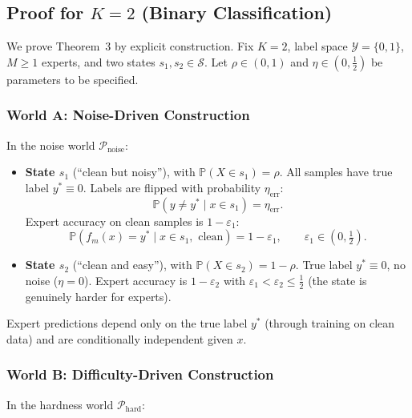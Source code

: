 \subsection{Proof for $K=2$ (Binary Classification)}
\label{sec:thm3_proof_K2}

We prove Theorem~3 by explicit construction.  Fix $K=2$, label space
$\mathcal{Y}=\{0,1\}$, $M\ge 1$ experts, and two states $s_1,s_2\in\mathcal{S}$.
Let $\rho\in(0,1)$ and $\eta\in(0,\tfrac12)$ be parameters to be specified.

\subsubsection{World A: Noise-Driven Construction}
\label{sec:thm3_worldA}

In the noise world $\mathcal{P}_{\text{noise}}$:

\begin{itemize}
  \item \textbf{State $s_1$} (``clean but noisy''), with
    $\mathbb{P}(X\in s_1)=\rho$.  All samples have true label $y^*\equiv0$.
    Labels are flipped with probability $\eta_{\text{err}}$:
    \[
    \mathbb{P}(y\neq y^* \mid x\in s_1)=\eta_{\text{err}}.
    \]
    Expert accuracy on clean samples is $1-\varepsilon_1$:
    \[
    \mathbb{P}(f_m(x)=y^* \mid x\in s_1,\text{ clean})=1-\varepsilon_1,
    \qquad \varepsilon_1\in(0,\tfrac12).
    \]
  \item \textbf{State $s_2$} (``clean and easy''), with
    $\mathbb{P}(X\in s_2)=1-\rho$.  True label $y^*\equiv0$, no noise
    ($\eta=0$).  Expert accuracy is $1-\varepsilon_2$ with
    $\varepsilon_1<\varepsilon_2\le\tfrac12$ (the state is genuinely harder
    for experts).
\end{itemize}

Expert predictions depend only on the true label $y^*$ (through training on
clean data) and are conditionally independent given $x$.

\subsubsection{World B: Difficulty-Driven Construction}
\label{sec:thm3_worldB}

In the hardness world $\mathcal{P}_{\text{hard}}$:

